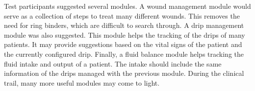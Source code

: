     Test participants suggested several modules. A wound management module would serve as a collection of steps to treat many different wounds. This removes the need for ring binders, which are difficult to search through. A drip management module was also suggested. This module helps the tracking of the drips of many patients. It may provide suggestions based on the vital signs of the patient and the currently configured drip. Finally, a fluid balance module helps tracking the fluid intake and output of a patient. The intake should include the same information of the drips managed with the previous module. During the clinical trail, many more useful modules may come to light.


